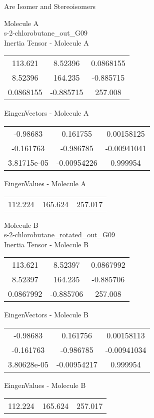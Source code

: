 \begin{center}
\vtab
\vtab
\textcolor{NavyBlue}{\Large Are Isomer and Stereoisomers}
\end{center}
\newpage
\begin{multicols}{2}
\begin{center}
Molecule A \\ 
s-2-chlorobutane\_out\_G09
\\
Inertia Tensor - Molecule A \\
\vtab
\begin{tabular}{|c c c|}
113.621	 & 	8.52396	 & 	0.0868155	 \\
8.52396	 & 	164.235	 & 	-0.885715	 \\
0.0868155	 & 	-0.885715	 & 	257.008
\end{tabular}

\vtab
 EingenVectors - Molecule A     \\
\vtab
\begin{tabular}{|c c c|}
-0.98683	 & 	0.161755	 & 	0.00158125	 \\
-0.161763	 & 	-0.986785	 & 	-0.00941041	 \\
3.81715e-05	 & 	-0.00954226	 & 	0.999954
\end{tabular}

\vtab
 EingenValues - Molecule A     \\
\vtab
\begin{tabular}{|c c c|}
112.224	 & 	165.624	 & 	257.017
\end{tabular}
\columnbreak

Molecule B \\ 
s-2-chlorobutane\_rotated\_out\_G09
\\
Inertia Tensor - Molecule B \\
\vtab
\begin{tabular}{|c c c|}
113.621	 & 	8.52397	 & 	0.0867992	 \\
8.52397	 & 	164.235	 & 	-0.885706	 \\
0.0867992	 & 	-0.885706	 & 	257.008
\end{tabular}

\vtab
 EingenVectors - Molecule B     \\
\vtab
\begin{tabular}{|c c c|}
-0.98683	 & 	0.161756	 & 	0.00158113	 \\
-0.161763	 & 	-0.986785	 & 	-0.00941034	 \\
3.80628e-05	 & 	-0.00954217	 & 	0.999954
\end{tabular}

\vtab
 EingenValues - Molecule B     \\
\vtab
\begin{tabular}{|c c c|}
112.224	 & 	165.624	 & 	257.017
\end{tabular}

\end{center}
\end{multicols}
